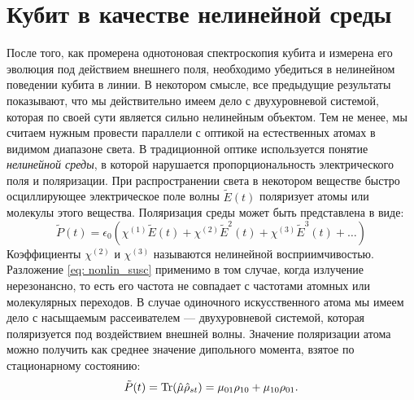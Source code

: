 \section{Кубит в качестве нелинейной среды}
После того, как промерена однотоновая спектроскопия кубита и измерена его эволюция под действием внешнего поля, необходимо убедиться в нелинейном поведении кубита в линии. В некотором смысле, все предыдущие результаты показывают, что мы действительно имеем дело с двухуровневой системой, которая по своей сути является сильно нелинейным объектом. Тем не менее, мы считаем нужным провести параллели с оптикой на естественных атомах в видимом диапазоне света. В традиционной оптике используется понятие \textit{нелинейной среды}, в которой нарушается пропорциональность электрического поля и поляризации. При распространении света в некотором веществе быстро осциллирующее электрическое поле волны $\tilde{E}(t)$ поляризует атомы или молекулы этого вещества. Поляризация среды может быть представлена в виде:
\begin{equation}
\tilde{P}(t) = \epsilon_0\left(\chi^{(1)}\tilde{E}(t) + \chi^{(2)}\tilde{E}^2(t) + \chi^{(3)}\tilde{E}^3(t) + \ldots\right)
\label{eq: nonlin_susc}
\end{equation}
Коэффициенты $\chi^{(2)}$ и $\chi^{(3)}$ называются нелинейной восприимчивостью. Разложение \eqref{eq: nonlin_susc} применимо в том случае, когда излучение нерезонансно, то есть его частота не совпадает с частотами атомных или молекулярных переходов. В случае одиночного искусственного атома мы имеем дело с насыщаемым рассеивателем --- двухуровневой системой, которая поляризуется под воздействием внешней волны. Значение поляризации атома можно получить как среднее значение дипольного момента, взятое по стационарному состоянию:
\begin{equation}
\tilde{P}(t) = \operatorname{Tr}(\hat{\mu}\hat{\rho}_{st}) = \mu_{01}\rho_{10} + \mu_{10}\rho_{01}.
\end{equation}

